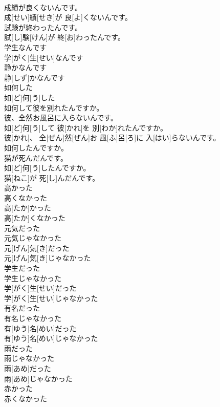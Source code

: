 \documentclass[8pt]{extreport}
\begin{document}
\begin{CJK}{UTF8}{min}
\\	成績が良くないんです。	
\\	成[せい]績[せき]が 良[よ]くないんです。
\\	試験が終わったんです。	
\\	試[し]験[けん]が 終[お]わったんです。
\\	学生なんです	
\\	学[がく]生[せい]なんです
\\	静かなんです	
\\	静[しず]かなんです
\\	如何した	
\\	如[ど]何[う]した
\\	如何して彼を別れたんですか。 
\\	彼、全然お風呂に入らないんです。	
\\	如[ど]何[う]して 彼[かれ]を 別[わか]れたんですか。 
\\	彼[かれ]、 全[ぜん]然[ぜん]お 風[ふ]呂[ろ]に 入[はい]らないんです。
\\	如何したんですか。 
\\	猫が死んだんです。	
\\	如[ど]何[う]したんですか。 
\\	猫[ねこ]が 死[し]んだんです。
\\	高かった 
\\	高くなかった	
\\	高[たか]かった 
\\	高[たか]くなかった
\\	元気だった 
\\	元気じゃなかった	
\\	元[げん]気[き]だった 
\\	元[げん]気[き]じゃなかった
\\	学生だった 
\\	学生じゃなかった	
\\	学[がく]生[せい]だった 
\\	学[がく]生[せい]じゃなかった
\\	有名だった 
\\	有名じゃなかった	
\\	有[ゆう]名[めい]だった 
\\	有[ゆう]名[めい]じゃなかった
\\	雨だった 
\\	雨じゃなかった	
\\	雨[あめ]だった 
\\	雨[あめ]じゃなかった
\\	赤かった 
\\	赤くなかった	

\end{CJK}
\end{document}
